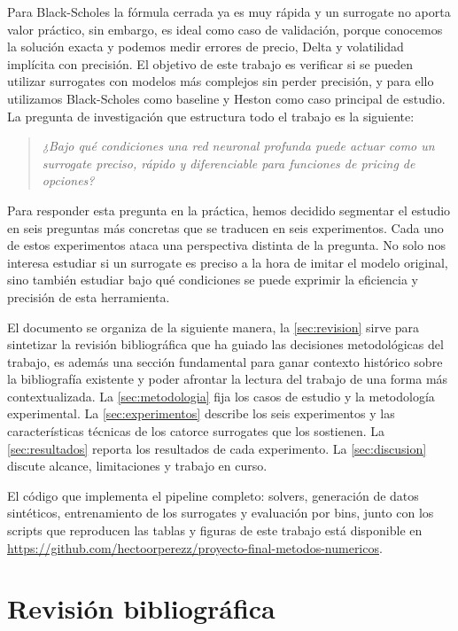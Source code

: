 \documentclass[11pt,a4paper]{article}
\begin{document}
Para Black-Scholes la fórmula cerrada ya es muy rápida y un surrogate no aporta valor práctico, sin embargo, es ideal como caso de validación, porque conocemos la solución exacta y podemos medir errores de precio, Delta y volatilidad implícita con precisión. El objetivo de este trabajo es verificar si se pueden utilizar surrogates con modelos más complejos sin perder precisión, y para ello utilizamos Black-Scholes como baseline y Heston como caso principal de estudio. La pregunta de investigación que estructura todo el trabajo es la siguiente:

\begin{quote}\itshape
¿Bajo qué condiciones una red neuronal profunda puede actuar como un surrogate preciso, rápido y diferenciable para funciones de pricing de opciones?
\end{quote}

Para responder esta pregunta en la práctica, hemos decidido segmentar el estudio en seis preguntas más concretas que se traducen en seis experimentos. Cada uno de estos experimentos ataca una perspectiva distinta de la pregunta. No solo nos interesa estudiar si un surrogate es preciso a la hora de imitar el modelo original, sino también estudiar bajo qué condiciones se puede exprimir la eficiencia y precisión de esta herramienta.

El documento se organiza de la siguiente manera, la \autoref{sec:revision} sirve para sintetizar la revisión bibliográfica que ha guiado las decisiones metodológicas del trabajo, es además una sección fundamental para ganar contexto histórico sobre la bibliografía existente y poder afrontar la lectura del trabajo de una forma más contextualizada. La \autoref{sec:metodologia} fija los casos de estudio y la metodología experimental. La \autoref{sec:experimentos} describe los seis experimentos y las características técnicas de los catorce surrogates que los sostienen. La \autoref{sec:resultados} reporta los resultados de cada experimento. La \autoref{sec:discusion} discute alcance, limitaciones y trabajo en curso.

El código que implementa el pipeline completo: solvers, generación de datos sintéticos, entrenamiento de los surrogates y evaluación por bins, junto con los scripts que reproducen las tablas y figuras de este trabajo está disponible en \url{https://github.com/hectoorperezz/proyecto-final-metodos-numericos}.

\section{Revisión bibliográfica}\label{sec:revision}
\end{document}
